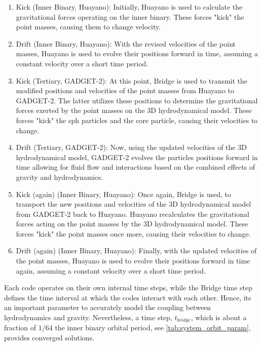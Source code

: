 \begin{enumerate}
    \item Kick (Inner Binary, Huayano): Initially, Huayano is used to calculate the gravitational forces operating on the inner binary. These forces "kick" the point masses, causing them to change velocity.
    \item Drift (Inner Binary, Huayano): With the revised velocities of the point masses, Huayano is used to evolve their positions forward in time, assuming a constant velocity over a short time period.
    \item Kick (Tertiary, GADGET-2): At this point, Bridge is used to transmit the modified positions and velocities of the point masses from Huayano to GADGET-2. The latter utilizes these positions to determine the gravitational forces exerted by the point masses on the 3D hydrodynamical model. These forces "kick" the \ac{sph} particles and the core particle, causing their velocities to change.
    \item Drift (Tertiary, GADGET-2): Now, using the updated velocities of the 3D hydrodynamical model, GADGET-2 evolves the particles positions forward in time allowing for fluid flow and interactions based on the combined effects of gravity and hydrodynamics.
    \item Kick (again) (Inner Binary, Huayano): Once again, Bridge is used, to transport the new positions and velocities of the 3D hydrodynamical model from GADGET-2 back to Huayano. Huayano recalculates the gravitational forces acting on the point masses by the 3D hydrodynamical model. These forces "kick" the point masses once more, causing their velocities to change.
    \item Drift (again) (Inner Binary, Huayano): Finally, with the updated velocities of the point masses, Huayano is used to evolve their positions forward in time again, assuming a constant velocity over a short time period.
\end{enumerate}

Each code operates on their own internal time steps, while the Bridge time step defines the time interval at which the codes interact with each other. Hence, its an important parameter to accurately model the coupling between hydrodynamics and gravity. Nevertheless, a time step, $t_{bridge}$, which is about a fraction of $1/64$ the inner binary orbital period, see \cref{tab:system_orbit_param}, provides converged solutions. 



